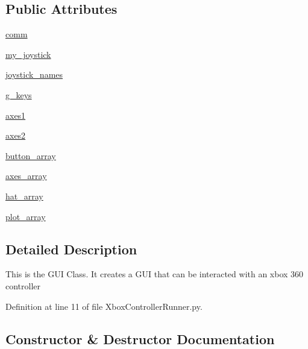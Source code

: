 \subsection*{Public Attributes}
\begin{DoxyCompactItemize}
\item 
\mbox{\hyperlink{class_xbox_controller_runner_1_1_g_u_i_ab1a48ff52a68b549b617a3137bb8995e}{comm}}
\item 
\mbox{\hyperlink{class_xbox_controller_runner_1_1_g_u_i_aaadfdb49cdbd847d87a2b634be729852}{my\+\_\+joystick}}
\item 
\mbox{\hyperlink{class_xbox_controller_runner_1_1_g_u_i_a6a17f17751fe4b8913f35ac549ee080d}{joystick\+\_\+names}}
\item 
\mbox{\hyperlink{class_xbox_controller_runner_1_1_g_u_i_a94e1e1505ff30c454813aa53e4ade8d8}{g\+\_\+keys}}
\item 
\mbox{\hyperlink{class_xbox_controller_runner_1_1_g_u_i_af74a819867619c92b520e3b25413ab37}{axes1}}
\item 
\mbox{\hyperlink{class_xbox_controller_runner_1_1_g_u_i_ae09486455929d82f9b38f67d1a3f3e74}{axes2}}
\item 
\mbox{\hyperlink{class_xbox_controller_runner_1_1_g_u_i_afb933e3e029950c47a18cd17ce4c5e12}{button\+\_\+array}}
\item 
\mbox{\hyperlink{class_xbox_controller_runner_1_1_g_u_i_a665e203c4b1de51b1277c68c31b9c518}{axes\+\_\+array}}
\item 
\mbox{\hyperlink{class_xbox_controller_runner_1_1_g_u_i_a866532499deca68c58ea48a7fbc9fc5d}{hat\+\_\+array}}
\item 
\mbox{\hyperlink{class_xbox_controller_runner_1_1_g_u_i_a53a92c59b526c922618e6998170b9b8d}{plot\+\_\+array}}
\end{DoxyCompactItemize}


\subsection{Detailed Description}
\begin{DoxyVerb}This is the GUI Class. It creates a GUI that can be interacted with an xbox 360 controller\end{DoxyVerb}
 

Definition at line 11 of file Xbox\+Controller\+Runner.\+py.



\subsection{Constructor \& Destructor Documentation}
\mbox{\label{class_xbox_controller_runner_1_1_g_u_i_a345349f30ae90bbfbb2ed6d9bceeb819}} 
